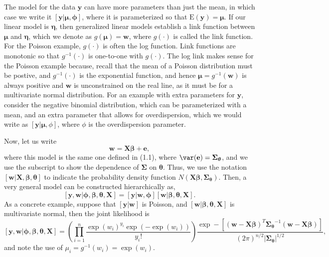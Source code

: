\documentclass[12pt, titlepage]{article}
\begin{document}
The model for the data $\mathbf{y}$ can have more parameters than just the mean, in which case we write it $[\mathbf{y}|\boldsymbol{\mu},\boldsymbol{\phi}]$, where it is parameterized so that $\textrm{E}(\mathbf{y}) = \boldsymbol{\mu}$.  If our linear model is $\boldsymbol{\eta}$, then generalized linear models establish a link function between $\boldsymbol{\mu}$ and $\boldsymbol{\eta}$, which we denote as $g(\boldsymbol{\mu}) = \mathbf{w}$, where $g(\cdot)$ is called the link function.  For the Poisson example, $g(\cdot)$ is often the log function.  Link functions are monotonic so that $g^{-1}(\cdot)$ is one-to-one with $g(\cdot)$.  The log link makes sense for the Poisson example because, recall that the mean of a Poisson distribution must be postive, and $g^{-1}(\cdot)$ is the exponential function, and hence $\boldsymbol{\mu} = g^{-1}(\mathbf{w})$ is always positive and $\mathbf{w}$ is unconstrained on the real line, as it must be for a multivariate normal distribution. For an example with extra parameters for $\mathbf{y}$, consider the negative binomial distribution, which can be parameterized with a mean, and an extra parameter that allows for overdispersion, which we would write as $[\mathbf{y}|\boldsymbol{\mu},\phi]$, where $\phi$ is the overdispersion parameter.  

Now, let us write
$$
\mathbf{w} = \mathbf{X}\boldsymbol{\beta} + \mathbf{e},
$$
where this model is the same one defined in (1.1), where $\var(\mathbf{e}) = \boldsymbol{\Sigma}_{\boldsymbol{\theta}}$, and we use the subscript to show the dependence of $\boldsymbol{\Sigma}$ on $\boldsymbol{\theta}$.  Thus, we use the notation $[\mathbf{w}|\mathbf{X},\boldsymbol{\beta},\boldsymbol{\theta}]$ to indicate the probability density function $N(\mathbf{X}\boldsymbol{\beta},\boldsymbol{\Sigma}_{\boldsymbol{\theta}})$.  Then, a very general model can be constructed hierarchically as,
\begin{equation} \label{eq:hsglm}
[\mathbf{y},\mathbf{w}|\boldsymbol{\phi},\boldsymbol{\beta},\boldsymbol{\theta},\mathbf{X}] = [\mathbf{y}|\mathbf{w},\boldsymbol{\phi}][\mathbf{w}|\boldsymbol{\beta},\boldsymbol{\theta},\mathbf{X}].
\end{equation}
As a concrete example, suppose that $[\mathbf{y}|\mathbf{w}]$ is Poisson, and $[\mathbf{w}|\boldsymbol{\beta},\boldsymbol{\theta},\mathbf{X}]$ is multivariate normal, then the joint likelihood is
$$
[\mathbf{y},\mathbf{w}|\boldsymbol{\phi},\boldsymbol{\beta},\boldsymbol{\theta},\mathbf{X}] = \left(\prod_{i=1}^{n}\frac{\exp(w_{i})^{y_{i}}\exp(-\exp(w_i))}{y_{i}!}\right)\frac{\exp-[(\mathbf{w} - \mathbf{X}\boldsymbol{\beta})^{T}\boldsymbol{\Sigma_{\boldsymbol{\theta}}}^{-1}(\mathbf{w} - \mathbf{X}\boldsymbol{\beta})]}{(2\pi)^{n/2}|\boldsymbol{\Sigma_{\boldsymbol{\theta}}}|^{1/2}},
$$
and note the use of $\mu_{i} = g^{-1}(w_{i}) = \exp(w_{i})$.
\end{document}
